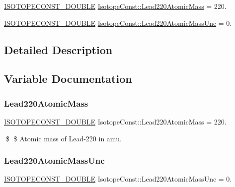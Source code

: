 \begin{DoxyCompactItemize}
\item 
\mbox{\hyperlink{group___isotope_const-_macros_ga8f45a7272ce02c0b4c65c44636ed719a}{I\+S\+O\+T\+O\+P\+E\+C\+O\+N\+S\+T\+\_\+\+D\+O\+U\+B\+LE}} \mbox{\hyperlink{group___isotope_const-_lead-_pb220_ga9d204017307aefe11ae35510addd0ba7}{Isotope\+Const\+::\+Lead220\+Atomic\+Mass}} = 220.
\item 
\mbox{\hyperlink{group___isotope_const-_macros_ga8f45a7272ce02c0b4c65c44636ed719a}{I\+S\+O\+T\+O\+P\+E\+C\+O\+N\+S\+T\+\_\+\+D\+O\+U\+B\+LE}} \mbox{\hyperlink{group___isotope_const-_lead-_pb220_ga7b8f50e4c4f2e319434b22e44577d59a}{Isotope\+Const\+::\+Lead220\+Atomic\+Mass\+Unc}} = 0.
\end{DoxyCompactItemize}


\subsection{Detailed Description}


\subsection{Variable Documentation}
\mbox{\label{group___isotope_const-_lead-_pb220_ga9d204017307aefe11ae35510addd0ba7}} 
\subsubsection{\texorpdfstring{Lead220\+Atomic\+Mass}{Lead220AtomicMass}}
{\footnotesize\ttfamily \mbox{\hyperlink{group___isotope_const-_macros_ga8f45a7272ce02c0b4c65c44636ed719a}{I\+S\+O\+T\+O\+P\+E\+C\+O\+N\+S\+T\+\_\+\+D\+O\+U\+B\+LE}} Isotope\+Const\+::\+Lead220\+Atomic\+Mass = 220.}

\$ \$ Atomic mass of Lead-\/220 in amu. \mbox{\label{group___isotope_const-_lead-_pb220_ga7b8f50e4c4f2e319434b22e44577d59a}} 
\subsubsection{\texorpdfstring{Lead220\+Atomic\+Mass\+Unc}{Lead220AtomicMassUnc}}
{\footnotesize\ttfamily \mbox{\hyperlink{group___isotope_const-_macros_ga8f45a7272ce02c0b4c65c44636ed719a}{I\+S\+O\+T\+O\+P\+E\+C\+O\+N\+S\+T\+\_\+\+D\+O\+U\+B\+LE}} Isotope\+Const\+::\+Lead220\+Atomic\+Mass\+Unc = 0.}

